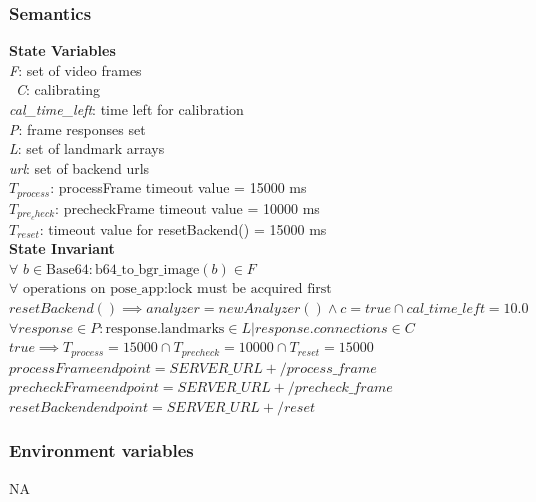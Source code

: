 \documentclass[12pt, titlepage]{article}
\begin{document}
\subsubsection{Semantics}

\noindent \textbf{State Variables} \\
\textit{F}: set of video frames\\\
\textit{C}: calibrating \\
\textit{cal\_time\_left}: time left for calibration\\
\textit{P}: frame responses set \\
\textit{L}: set of landmark arrays\\
\textit{url}: set of backend urls \\
\textit{$T_{process}$}: processFrame timeout value = 15000 ms\\
\textit{$T_{pre_check}$}: precheckFrame timeout value = 10000 ms\\
\textit{$T_{reset}$}: timeout value for resetBackend() = 15000 ms\\ 


\noindent \textbf{State Invariant} \\
\noindent
$\forall$ $b \in \text{Base64}: \text{b64\_to\_bgr\_image}(b) \in F$\\
$\forall$ $\text{operations on pose\_app}: \text{lock must be acquired first}$\\
$resetBackend() \implies analyzer = new Analyzer() \land c = true \cap cal\_time\_left = 10.0$
$\forall response \in P: \text{response.landmarks} \in L | response.connections \in C$\\
$true \implies T_{process} = 15000 \cap T_{precheck} = 10000 \cap T_{reset} = 15000$ \\
$processFrame endpoint = SERVER\_URL + /process\_frame$\\
$precheckFrame endpoint = SERVER\_URL + /precheck\_frame$\\
$resetBackend endpoint = SERVER\_URL + /reset$\\


\subsubsection{Environment variables}
NA\\
\end{document}
